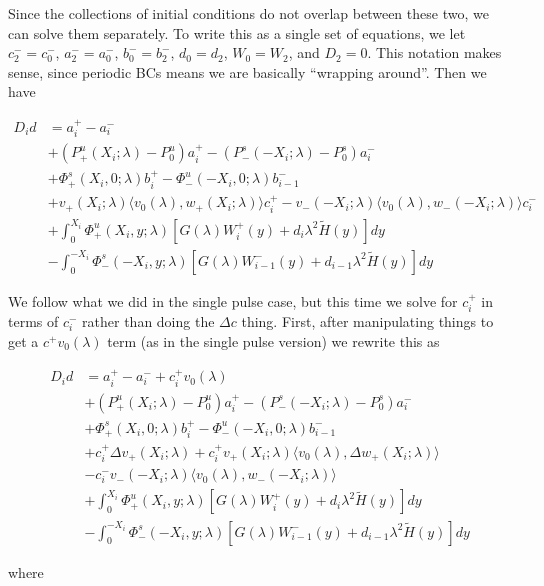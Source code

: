 \documentclass[12pt]{article}
\begin{document}
\begin{enumerate}
Since the collections of initial conditions do not overlap between these two, we can solve them separately. To write this as a single set of equations, we let $c_2^- = c_0^-$, $a_2^- = a_0^-$, $b_0^- = b_2^-$, $d_0 = d_2$, $W_0 = W_2$, and $D_2 = 0$. This notation makes sense, since periodic BCs means we are basically ``wrapping around''. Then we have


\begin{align*}
D_i d &= a_i^+ - a_i^- \\
&+ (P^u_+(X_i; \lambda) - P_0^u)a_i^+ - (P^s_-(-X_i; \lambda) - P_0^s)a_i^- \\
&+ \Phi^s_+(X_i, 0; \lambda)b_i^+ - \Phi^u_-(-X_i, 0; \lambda)b_{i-1}^- \\
&+ v_+(X_i; \lambda) \langle v_0(\lambda), w_+(X_i; \lambda) \rangle c_i^+ - v_-(-X_i; \lambda) \langle v_0(\lambda), w_-(-X_i; \lambda) \rangle c_i^- \\
&+ \int_0^{X_i} \Phi^u_+(X_i, y; \lambda) [ G(\lambda)W_i^+(y) + d_i \lambda^2 \tilde{H}(y) ] dy \\
&- \int_0^{-X_i} \Phi^s_-(-X_i, y; \lambda) [ G(\lambda)W_{i-1}^-(y) + d_{i-1} \lambda^2 \tilde{H}(y) ] dy
\end{align*}

We follow what we did in the single pulse case, but this time we solve for $c_i^+$ in terms of $c_i^-$ rather than doing the $\Delta c$ thing. First, after manipulating things to get a $c^+ v_0(\lambda)$ term (as in the single pulse version) we rewrite this as

\begin{align*}
D_i d &= a_i^+ - a_i^- + c_i^+ v_0(\lambda) \\
&+ (P^u_+(X_i; \lambda) - P_0^u)a_i^+ - (P^s_-(-X_i; \lambda) - P_0^s)a_i^- \\
&+ \Phi^s_+(X_i, 0; \lambda)b_i^+ - \Phi^u_-(-X_i, 0; \lambda)b_{i-1}^- \\
&+ c_i^+ \Delta v_+(X_i; \lambda) + c_i^+ v_+(X_i; \lambda) \langle v_0(\lambda), \Delta w_+(X_i; \lambda) \rangle \\
&- c_i^- v_-(-X_i; \lambda) \langle v_0(\lambda), w_-(-X_i; \lambda) \rangle \\
&+ \int_0^{X_i} \Phi^u_+(X_i, y; \lambda) [ G(\lambda)W_i^+(y) + d_i \lambda^2 \tilde{H}(y) ] dy \\
&- \int_0^{-X_i} \Phi^s_-(-X_i, y; \lambda) [ G(\lambda)W_{i-1}^-(y) + d_{i-1} \lambda^2 \tilde{H}(y) ] dy
\end{align*}

where


\end{enumerate}
\end{document}
